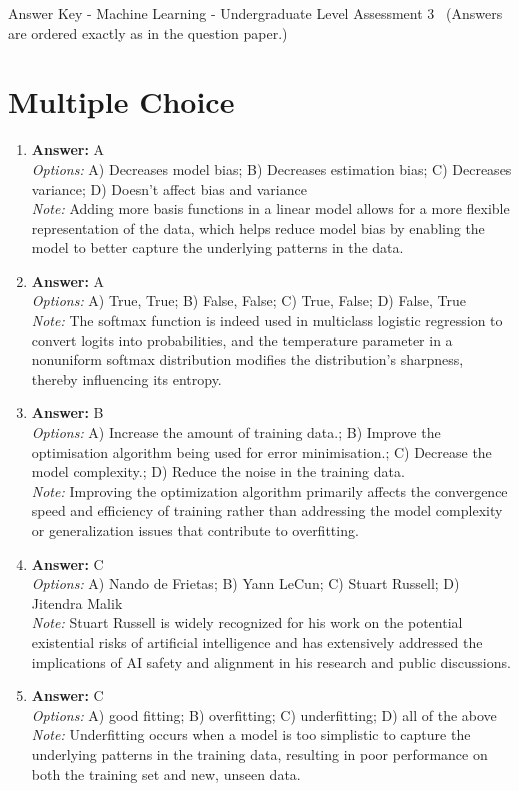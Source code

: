 \documentclass[12pt]{article}
\begin{document}
\begin{center}
Answer Key - Machine Learning - Undergraduate Level Assessment 3 \
\small (Answers are ordered exactly as in the question paper.)
\end{center}

\section*{Multiple Choice}
\begin{enumerate}[label=\arabic*.]
\item \textbf{Answer:} A
\\ \textit{Options:} A) Decreases model bias; B) Decreases estimation bias; C) Decreases variance; D) Doesn't affect bias and variance
\\ \textit{Note:} Adding more basis functions in a linear model allows for a more flexible representation of the data, which helps reduce model bias by enabling the model to better capture the underlying patterns in the data.
\item \textbf{Answer:} A
\\ \textit{Options:} A) True, True; B) False, False; C) True, False; D) False, True
\\ \textit{Note:} The softmax function is indeed used in multiclass logistic regression to convert logits into probabilities, and the temperature parameter in a nonuniform softmax distribution modifies the distribution's sharpness, thereby influencing its entropy.
\item \textbf{Answer:} B
\\ \textit{Options:} A) Increase the amount of training data.; B) Improve the optimisation algorithm being used for error minimisation.; C) Decrease the model complexity.; D) Reduce the noise in the training data.
\\ \textit{Note:} Improving the optimization algorithm primarily affects the convergence speed and efficiency of training rather than addressing the model complexity or generalization issues that contribute to overfitting.
\item \textbf{Answer:} C
\\ \textit{Options:} A) Nando de Frietas; B) Yann LeCun; C) Stuart Russell; D) Jitendra Malik
\\ \textit{Note:} Stuart Russell is widely recognized for his work on the potential existential risks of artificial intelligence and has extensively addressed the implications of AI safety and alignment in his research and public discussions.
\item \textbf{Answer:} C
\\ \textit{Options:} A) good fitting; B) overfitting; C) underfitting; D) all of the above
\\ \textit{Note:} Underfitting occurs when a model is too simplistic to capture the underlying patterns in the training data, resulting in poor performance on both the training set and new, unseen data.
\end{enumerate}
\end{document}
